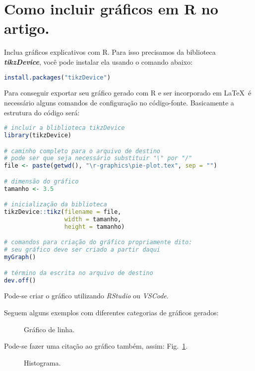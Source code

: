 \section{Como incluir gráficos em R no artigo.}
\label{sec:rgrap}

Inclua gráficos explicativos com R. Para isso precisamos da biblioteca \textit{\textbf{tikzDevice}}, você pode instalar ela usando o comando abaixo:

\begin{lstlisting}[language=R]
install.packages("tikzDevice")
\end{lstlisting}

Para conseguir exportar seu gráfico gerado com R e ser incorporado em \LaTeX\ é necessário alguns comandos de configuração no código-fonte. Basicamente a estrutura do código será:

\begin{lstlisting}[language=R]
# incluir a bliblioteca tikzDevice
library(tikzDevice)

# caminho completo para o arquivo de destino
# pode ser que seja necessário substituir "\" por "/"
file <- paste(getwd(), "\r-graphics\pie-plot.tex", sep = "")

# dimensão do gráfico
tamanho <- 3.5

# inicialização da biblioteca 
tikzDevice::tikz(filename = file,
                 width = tamanho,
                 height = tamanho)

# comandos para criação do gráfico propriamente dito:
# seu gráfico deve ser criado a partir daqui
myGraph()

# término da escrita no arquivo de destino
dev.off()
\end{lstlisting}

Pode-se criar o gráfico utilizando \textit{RStudio} ou \textit{VSCode}.

Seguem alguns exemplos com diferentes categorias de gráficos gerados:

\begin{figure}[H]
    \centering
    
    \caption{Gráfico de linha.}
    \label{graph:linha}
\end{figure}

Pode-se fazer uma citação ao gráfico também, assim: Fig.~\ref{graph:linha}.

\begin{figure}[H]
    \centering
    
    \caption{Histograma.}
    \label{graph:histograma}
\end{figure}


